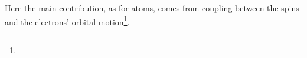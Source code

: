 Here the main contribution, as for atoms, comes from coupling between the spins and the electrons' orbital motion\footnote{%
%
%
}.
